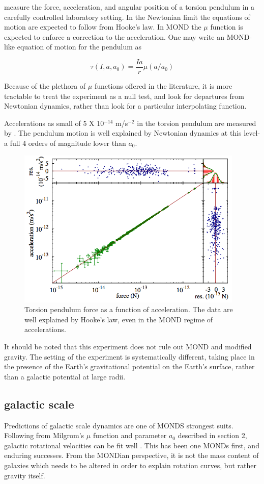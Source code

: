\documentclass[12pt]{article}
\begin{document}
\cite{Gundlach2007} measure the force, acceleration, and angular position of a torsion pendulum in a carefully controlled laboratory setting. In the Newtonian limit the equations of motion are expected to follow from Hooke's law. In MOND the  $\mu$ function is expected to enforce a correction to the acceleration. One may write an MOND-like equation of motion for the pendulum as 

$$\tau(I,a,a_{0}) = \frac{Ia}{r} \mu(a/a_{0}) $$

Because of the plethora of $\mu$ functions offered in the literature, it is more tractable to treat the experiment as a null test, and look for departures from Newtonian dynamics, rather than look for a particular interpolating function. 

Accelerations as small of 5 X 10$^{-14}$ m/s$^{-2}$ in the torsion pendulum are measured by \cite{Gundlach2007}. The pendulum motion is well explained by Newtonian dynamics at this level-a full 4 orders of magnitude lower than $a_{0}$.

\begin{figure}
\centering
\includegraphics[height=3in]{pendulum.png}
\caption{Torsion pendulum force as a function of acceleration. The data are well explained by Hooke's law, even in the MOND regime of accelerations.  \cite{Gundlach2007}}
\end{figure}

It should be noted that this experiment does not rule out MOND and modified gravity. The setting of the experiment is systematically different, taking place in the presence of the Earth's gravitational potential on the Earth's surface, rather than a galactic potential at large radii. 
\subsection{galactic scale}
Predictions of galactic scale dynamics are one of MONDS strongest suits. Following from Milgrom's $\mu$ function and parameter $a_{0}$ described in section 2, galactic rotational velocities  can be fit well \cite{Begeman1991}. This has been one MONDs first, and enduring successes. From the MONDian perspective, it is not the mass content of galaxies which needs to be altered in order to explain rotation curves, but rather gravity itself. 
\end{document}
